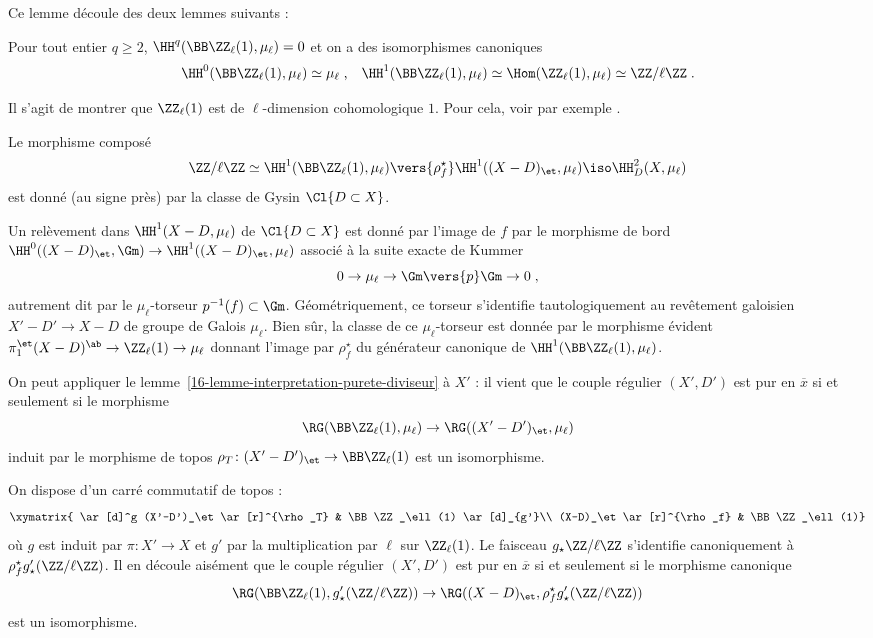 \documentclass[10pt]{../fichiers-configuration-latex/smfart}
\begin{document}
Ce lemme découle des deux lemmes suivants :

\begin{lemme2}
Pour tout entier $q\geq 2$, $\HH^q(\BB\ZZ_\ell(1),\mu_\ell)=0$ et on a
des isomorphismes canoniques
\[\HH^0(\BB\ZZ_\ell(1),\mu_\ell)\simeq \mu_\ell\;\text{,}\quad
\HH^1(\BB\ZZ_\ell(1),\mu_\ell)\simeq  \Hom(\ZZ_\ell(1),\mu_\ell)
\simeq \ZZ/\ell\ZZ\;\text{.}\]
\end{lemme2}

Il s'agit de montrer que $\ZZ_\ell(1)$ est de $\ell$-dimension
cohomologique $1$. Pour cela, voir par exemple
\cite[§3.4, chapitre~I]{CG@Serre}.

\begin{lemme2}
Le morphisme composé \[\ZZ/\ell\ZZ\simeq
\HH^1(\BB\ZZ_\ell(1),\mu_\ell)\vers{\rho_f^\star}\HH^1((X-D)_\et,\mu_\ell)\iso
\HH^2_D(X,\mu_\ell)\] est donné (au signe près) par la classe de Gysin
$\Cl{D\subset X}$.
\end{lemme2}

Un relèvement dans $\HH^1(X-D,\mu_\ell)$ de $\Cl{D\subset X}$ est donné par
l'image de $f$ par le morphisme de bord $\HH^0((X-D)_\et,\Gm)\to
\HH^1((X-D)_\et,\mu_\ell)$ associé à la suite exacte de Kummer
\[0\to \mu_\ell\to \Gm\vers{p} \Gm\to 0\;\text{,}\]
autrement dit par le $\mu_\ell$-torseur $p^{-1}(f)\subset \Gm$.
Géométriquement, ce
torseur s'identifie tautologiquement au revêtement galoisien $X'-D'\to X-D$
de groupe de Galois $\mu_\ell$. Bien sûr,
la classe de ce $\mu_\ell$-torseur est 
donnée par le morphisme évident $\pi_1^\et(X-D)^\ab\to\ZZ_\ell(1)\to
\mu_\ell$ donnant l'image par $\rho_f^\star$ du générateur canonique de
$\HH^1(\BB\ZZ_\ell(1),\mu_\ell)$.

\bigskip

On peut appliquer le lemme~\ref{16-lemme-interpretation-purete-diviseur} à
$X'$ : il vient que le couple régulier $(X',D')$ est pur en $\overline x$
si et seulement si
le morphisme
\[\RG(\BB\ZZ_\ell(1),\mu_\ell)\to\RG((X'-D')_\et,
\mu_\ell)\]
induit par le morphisme de topos $\rho_T\colon (X'-D')_\et\to
\BB\ZZ_\ell(1)$ est un isomorphisme.

On dispose d'un carré commutatif de topos :
\[
\xymatrix{
\ar[d]^g (X'-D')_\et\ar[r]^{\rho_T} & \BB\ZZ_\ell(1)
 \ar[d]_{g'}\\
(X-D)_\et\ar[r]^{\rho_f} & \BB\ZZ_\ell(1)}
\]
où $g$ est induit par $\pi\colon X'\to X$ et $g'$ par la multiplication par
$\ell$ sur $\ZZ_\ell(1)$. Le faisceau $g_\star \ZZ/\ell\ZZ$
s'identifie canoniquement à
$\rho_f^\star g'_\star(\ZZ/\ell\ZZ)$. Il en découle aisément que le couple
régulier $(X',D')$ est pur en $\overline x$
si et seulement si le morphisme canonique
\[\RG(\BB\ZZ_\ell(1),g'_\star(\ZZ/\ell\ZZ))\to
\RG((X-D)_\et,\rho_f^\star
g'_\star(\ZZ/\ell\ZZ)) \]
est un isomorphisme.
\end{document}
